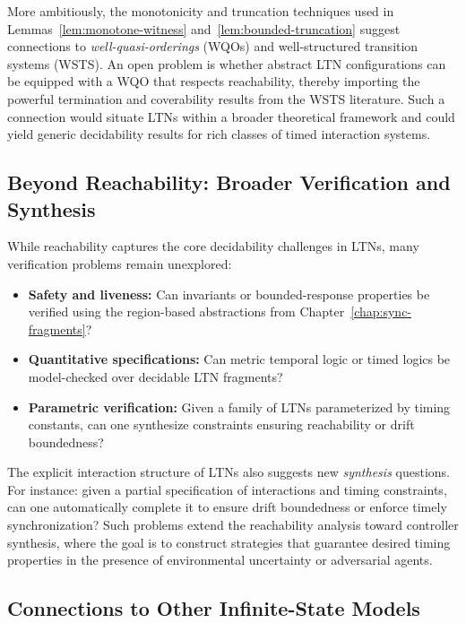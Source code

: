 More ambitiously, the monotonicity and truncation techniques used in Lemmas~\ref{lem:monotone-witness} and~\ref{lem:bounded-truncation} suggest connections to \emph{well-quasi-orderings} (WQOs) and well-structured transition systems (WSTS). An open problem is whether abstract LTN configurations can be equipped with a WQO that respects reachability, thereby importing the powerful termination and coverability results from the WSTS literature. Such a connection would situate LTNs within a broader theoretical framework and could yield generic decidability results for rich classes of timed interaction systems.

\subsection{Beyond Reachability: Broader Verification and Synthesis}

While reachability captures the core decidability challenges in LTNs, many verification problems remain unexplored:
\begin{itemize}
\item \textbf{Safety and liveness:} Can invariants or bounded-response properties be verified using the region-based abstractions from Chapter~\ref{chap:sync-fragments}?
\item \textbf{Quantitative specifications:} Can metric temporal logic or timed logics be model-checked over decidable LTN fragments?
\item \textbf{Parametric verification:} Given a family of LTNs parameterized by timing constants, can one synthesize constraints ensuring reachability or drift boundedness?
\end{itemize}

The explicit interaction structure of LTNs also suggests new \emph{synthesis} questions. For instance: given a partial specification of interactions and timing constraints, can one automatically complete it to ensure drift boundedness or enforce timely synchronization? Such problems extend the reachability analysis toward controller synthesis, where the goal is to construct strategies that guarantee desired timing properties in the presence of environmental uncertainty or adversarial agents.

\subsection{Connections to Other Infinite-State Models}

